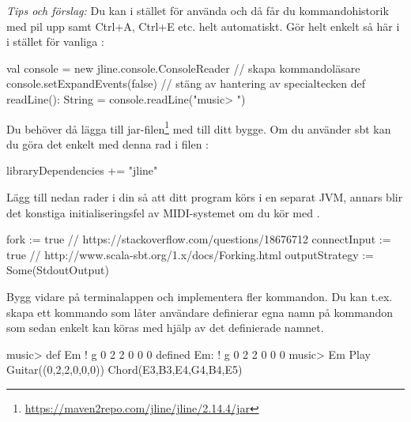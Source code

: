 {\noindent\emph{Tips och förslag:} Du kan i stället för  använda  och då får du kommandohistorik med pil upp samt Ctrl+A, Ctrl+E etc. helt automatiskt. Gör helt enkelt så här i  i stället för vanliga :
\begin{CodeSmall}
  val console = new jline.console.ConsoleReader // skapa kommandoläsare
  console.setExpandEvents(false) // stäng av hantering av specialtecken
  def readLine(): String = console.readLine("music> ")
\end{CodeSmall}
Du behöver då lägga till jar-filen\footnote{\url{https://maven2repo.com/jline/jline/2.14.4/jar}} med  till ditt bygge. Om du använder sbt kan du göra det enkelt med denna rad i filen :
\begin{CodeSmall}
libraryDependencies += "jline" %
\end{CodeSmall}
Lägg till nedan rader i din  så att ditt program körs i en separat JVM, annars blir det konstiga initialiseringsfel av MIDI-systemet om du kör med .

\begin{CodeSmall}
fork                := true // https://stackoverflow.com/questions/18676712
connectInput        := true // http://www.scala-sbt.org/1.x/docs/Forking.html
outputStrategy      := Some(StdoutOutput)
\end{CodeSmall}


\Task Bygg vidare på terminalappen  och implementera fler kommandon. Du kan t.ex. skapa ett kommando som låter användare definierar egna namn på kommandon som sedan enkelt kan köras med hjälp av det definierade namnet.
\begin{REPL}
music> def Em ! g 0 2 2 0 0 0
defined Em: ! g 0 2 2 0 0 0
music> Em
Play Guitar((0,2,2,0,0,0)) Chord(E3,B3,E4,G4,B4,E5)
\end{REPL}


}
